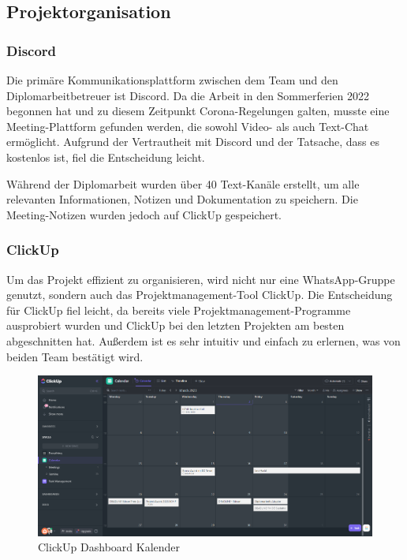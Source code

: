 \subsection{Projektorganisation}

\subsubsection{Discord}
Die primäre Kommunikationsplattform zwischen dem Team und den Diplomarbeitbetreuer ist Discord. Da die Arbeit in den Sommerferien 2022 begonnen hat und zu diesem Zeitpunkt Corona-Regelungen galten, musste eine Meeting-Plattform gefunden werden, die sowohl Video- als auch Text-Chat ermöglicht. Aufgrund der Vertrautheit mit Discord und der Tatsache, dass es kostenlos ist, fiel die Entscheidung leicht.

Während der Diplomarbeit wurden über 40 Text-Kanäle erstellt, um alle relevanten Informationen, Notizen und Dokumentation zu speichern. Die Meeting-Notizen wurden jedoch auf ClickUp gespeichert.
\subsubsection{ClickUp}
Um das Projekt effizient zu organisieren, wird nicht nur eine WhatsApp-Gruppe genutzt, sondern auch das Projektmanagement-Tool ClickUp. Die Entscheidung für ClickUp fiel leicht, da bereits viele Projektmanagement-Programme ausprobiert wurden und ClickUp bei den letzten Projekten am besten abgeschnitten hat. Außerdem ist es sehr intuitiv und einfach zu erlernen, was von beiden Team bestätigt wird.

\begin{figure}
    \centering
    \includegraphics[width=1\textwidth]{./pics/clickup-calender-view.png}
    \caption{ClickUp Dashboard Kalender}
    \label{fig:clickup-calendar}
\end{figure}


